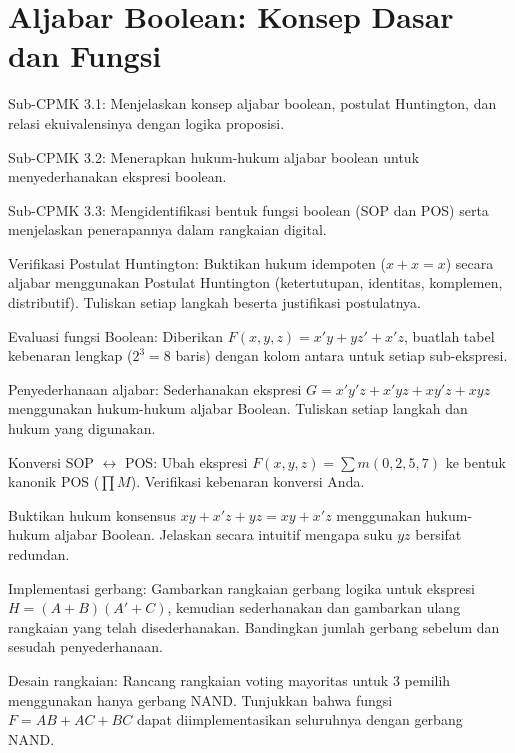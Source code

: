 \documentclass[../main]{subfiles}
\begin{document}
\chapter{Aljabar Boolean: Konsep Dasar dan Fungsi}

\begin{subcpmk}
  \item Sub-CPMK 3.1: Menjelaskan konsep aljabar boolean, postulat Huntington, dan relasi ekuivalensinya dengan logika proposisi.
  \item Sub-CPMK 3.2: Menerapkan hukum-hukum aljabar boolean untuk menyederhanakan ekspresi boolean.
  \item Sub-CPMK 3.3: Mengidentifikasi bentuk fungsi boolean (SOP dan POS) serta menjelaskan penerapannya dalam rangkaian digital.
\end{subcpmk}










\begin{aktivitas}
  \item Verifikasi Postulat Huntington: Buktikan hukum idempoten ($x + x = x$) secara aljabar menggunakan Postulat Huntington (ketertutupan, identitas, komplemen, distributif). Tuliskan setiap langkah beserta justifikasi postulatnya.
  \item Evaluasi fungsi Boolean: Diberikan $F(x,y,z) = x'y + yz' + x'z$, buatlah tabel kebenaran lengkap ($2^3 = 8$ baris) dengan kolom antara untuk setiap sub-ekspresi.
  \item Penyederhanaan aljabar: Sederhanakan ekspresi $G = x'y'z + x'yz + xy'z + xyz$ menggunakan hukum-hukum aljabar Boolean. Tuliskan setiap langkah dan hukum yang digunakan.
  \item Konversi SOP $\leftrightarrow$ POS: Ubah ekspresi $F(x,y,z) = \sum m(0, 2, 5, 7)$ ke bentuk kanonik POS ($\prod M$). Verifikasi kebenaran konversi Anda.
  \item Buktikan hukum konsensus $xy + x'z + yz = xy + x'z$ menggunakan hukum-hukum aljabar Boolean. Jelaskan secara intuitif mengapa suku $yz$ bersifat redundan.
  \item Implementasi gerbang: Gambarkan rangkaian gerbang logika untuk ekspresi $H = (A + B)(A' + C)$, kemudian sederhanakan dan gambarkan ulang rangkaian yang telah disederhanakan. Bandingkan jumlah gerbang sebelum dan sesudah penyederhanaan.
  \item Desain rangkaian: Rancang rangkaian voting mayoritas untuk 3 pemilih menggunakan hanya gerbang NAND. Tunjukkan bahwa fungsi $F = AB + AC + BC$ dapat diimplementasikan seluruhnya dengan gerbang NAND.
\end{aktivitas}
\end{document}
